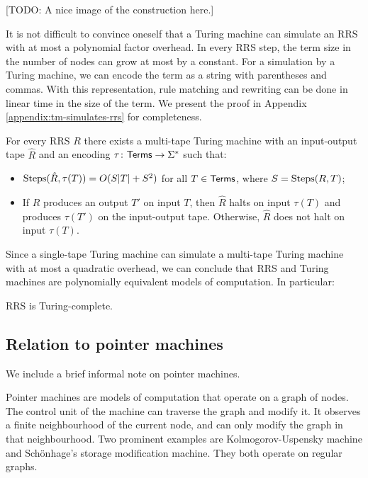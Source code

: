 \documentclass[11pt]{article}
\begin{document}
[TODO: A nice image of the construction here.]

It is not difficult to convince oneself that a Turing machine can simulate an RRS with
at most a polynomial factor overhead. In every RRS step, the term size in the number
of nodes can grow at most by a constant. For a simulation by a Turing machine, we can
encode the term as a string with parentheses and commas. With this representation,
rule matching and rewriting can be done in linear time in the size of the term.
We present the proof in Appendix \ref{appendix:tm-simulates-rrs} for completeness.

\begin{lemma}
For every RRS $R$ there exists a multi-tape Turing machine with an input-output tape
$\hat R$ and an encoding $\tau \colon \mathsf{Terms} \to \Sigma^*$ such that:
\begin{itemize}
  \item $\mathrm{Steps}(\hat R, \tau(T)) = O(S|T| + S^2)$ for all $T \in \mathsf{Terms}$, where $S = \mathrm{Steps}(R, T)$;
  \item If $R$ produces an output $T'$ on input $T$, then $\hat R$ halts on input $\tau(T)$
  and produces $\tau(T')$ on the input-output tape. Otherwise, $\hat R$ does not halt on input $\tau(T)$.
\end{itemize}
\end{lemma}

Since a single-tape Turing machine can simulate a multi-tape Turing machine with at most
a quadratic overhead, we can conclude that RRS and Turing machines are polynomially equivalent
models of computation. In particular:

\begin{corollary}
RRS is Turing-complete.
\end{corollary}


\subsection{Relation to pointer machines}

We include a brief informal note on pointer machines.

Pointer machines are models of computation that operate on a graph of nodes.
The control unit of the machine can traverse the graph and modify it. It observes
a finite neighbourhood of the current node, and can only modify the graph in that
neighbourhood. Two prominent examples are Kolmogorov-Uspensky machine and Schönhage's
storage modification machine. They both operate on regular graphs.
\end{document}
